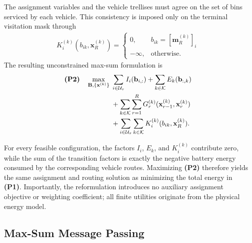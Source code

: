 The assignment variables and the vehicle trellises must agree on the set of bins serviced by each vehicle. This consistency is imposed only on the terminal visitation mask through
\begin{align}
K_i^{(k)}(b_{ik},\mathbf{x}_R^{(k)})=
\begin{cases}
0, & b_{ik}=[\mathbf{m}_R^{(k)}]_i\\
-\infty, & \text{otherwise}.
\end{cases}
\label{eq:bridge-factor}
\end{align}
The resulting unconstrained max-sum formulation is
\begin{align}
\textbf{(P2)}\quad
\max_{\mathbf B,\{\mathbf{x}^{(k)}\}}\;
&\sum_{i\in\mathcal{U}_{\tau}} I_i(\mathbf b_{i,:})
+\sum_{k\in\mathcal K}E_k(\mathbf b_{:,k}) \notag\\
&+\sum_{k\in\mathcal K}\sum_{r=1}^{R}
G_r^{(k)}(\mathbf{x}_{r-1}^{(k)},\mathbf{x}_r^{(k)}) \notag\\
&+\sum_{i\in\mathcal{U}_{\tau}}\sum_{k\in\mathcal K}
K_i^{(k)}(b_{ik},\mathbf{x}_R^{(k)}).
\label{eq:factorized-problem}
\end{align}

For every feasible configuration, the factors $I_i$, $E_k$, and $K_i^{(k)}$ contribute zero, while the sum of the transition factors is exactly the negative battery energy consumed by the corresponding vehicle routes. Maximizing \textbf{(P2)} therefore yields the same assignment and routing solution as minimizing the total energy in \textbf{(P1)}. Importantly, the reformulation introduces no auxiliary assignment objective or weighting coefficient; all finite utilities originate from the physical energy model.

\subsection{Max-Sum Message Passing}
\label{sec:max-sum}

